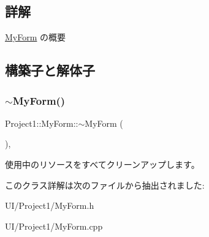 \subsection{詳解}
\hyperlink{class_project1_1_1_my_form}{My\+Form} の概要 



\subsection{構築子と解体子}
\mbox{\label{class_project1_1_1_my_form_a501b2b4481b72877fc73101f1d6f26be}} 
\subsubsection{\texorpdfstring{$\sim$\+My\+Form()}{~MyForm()}}
{\footnotesize\ttfamily Project1\+::\+My\+Form\+::$\sim$\+My\+Form (\begin{DoxyParamCaption}{ }\end{DoxyParamCaption})\hspace{0.3cm}{\ttfamily [inline]}, {\ttfamily [protected]}}



使用中のリソースをすべてクリーンアップします。 



このクラス詳解は次のファイルから抽出されました\+:\begin{DoxyCompactItemize}
\item 
U\+I/\+Project1/My\+Form.\+h\item 
U\+I/\+Project1/My\+Form.\+cpp\end{DoxyCompactItemize}
